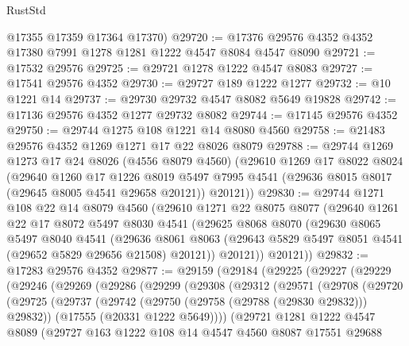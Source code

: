 \begin{lexlean}{RustStd}
\begin{coremodule}
{\begin{coremodule}
{{{{{{{{{{{{{{{{{{{{{{{{{{{{{{{{{{{{{{{{{{{{{{{{{{{{{{{      @17355
      @17359
      @17364
      @17370)
@29720 := @17376 @29576 @4352 @4352 @17380 @7991 @1278 @1281 @1222 @4547 @8084 @4547 @8090
@29721 := @17532 @29576
@29725 := @29721 @1278 @1222 @4547 @8083
@29727 := @17541 @29576 @4352
@29730 := @29727 @189 @1222 @1277
@29732 := @10 @1221 @14
@29737 := @29730 @29732 @4547 @8082 @5649 @19828
@29742 := @17136 @29576 @4352 @1277 @29732 @8082
@29744 := @17145 @29576 @4352
@29750 := @29744 @1275 @108 @1221 @14 @8080 @4560
@29758 := @21483 @29576 @4352 @1269 @1271 @17 @22 @8026 @8079
@29788 := @29744
    @1269
    @1273
    @17
    @24
    @8026
    (@4556 @8079 @4560)
    (@29610
      @1269
      @17
      @8022
      @8024
      (@29640
        @1260
        @17
        @1226
        @8019
        @5497
        @7995
        @4541
        (@29636 @8015 @8017 (@29645 @8005 @4541 @29658 @20121))
        @20121))
@29830 := @29744
    @1271
    @108
    @22
    @14
    @8079
    @4560
    (@29610
      @1271
      @22
      @8075
      @8077
      (@29640
        @1261
        @22
        @17
        @8072
        @5497
        @8030
        @4541
        (@29625
          @8068
          @8070
          (@29630
            @8065
            @5497
            @8040
            @4541
            (@29636
              @8061
              @8063
              (@29643 @5829 @5497 @8051 @4541 (@29652 @5829 @29656 @21508) @20121))
            @20121))
        @20121))
@29832 := @17283 @29576 @4352
@29877 := @29159
    (@29184
      (@29225
        (@29227
          (@29229
            (@29246
              (@29269
                (@29286
                  (@29299
                    (@29308
                      (@29312
                        (@29571
                          (@29708
                            (@29720
                              (@29725
                                (@29737
                                  (@29742 (@29750 (@29758 (@29788 (@29830 @29832))) @29832))
                                  (@17555 (@20331 @1222 @5649))))
                              (@29721
                                @1281
                                @1222
                                @4547
                                @8089
                                (@29727
                                  @163
                                  @1222
                                  @108
                                  @14
                                  @4547
                                  @4560
                                  @8087
                                  @17551
                                  @29688
}}}}}}}}}}}}}}}}}}}}}}}}}}}}}}}}}}}}}}}}}}}}}}}}}}}}}}}
\end{coremodule}}
\end{coremodule}
\end{lexlean}

